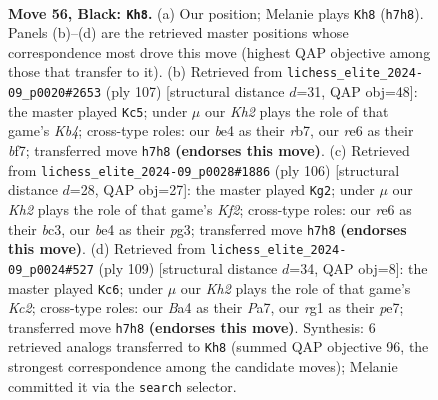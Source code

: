 \documentclass[11pt]{article}
\begin{document}
\clearpage

\begin{figure}[p]\centering
\begin{subfigure}{0.46\textwidth}\centering
\resizebox{\linewidth}{!}{%
\newchessgame
\chessboard[
  setfen={1r1r4/7k/pp2R3/8/bP2B3/P6K/8/6R1 b - - 15 56},
  showmover=false,
  pgfstyle=straightmove, color=movearrow, markmove={h7-h8}
]}
\caption{}
\end{subfigure}\hfill
\begin{subfigure}{0.46\textwidth}\centering
\resizebox{\linewidth}{!}{%
\newchessgame
\chessboard[
  setfen={8/1R3B2/3r2p1/1k6/8/b2p2P1/5P2/4K3 b - - 6 54},
  showmover=false,
  pgfstyle=straightmove, color=movearrow, markmove={b5-c5}
]}
\caption{}
\end{subfigure}
\\[4pt]
\begin{subfigure}{0.46\textwidth}\centering
\resizebox{\linewidth}{!}{%
\newchessgame
\chessboard[
  setfen={8/P7/R7/2r2p1k/4pP2/R1b3pP/5K2/3r4 w - - 0 54},
  showmover=false,
  pgfstyle=straightmove, color=movearrow, markmove={f2-g2}
]}
\caption{}
\end{subfigure}\hfill
\begin{subfigure}{0.46\textwidth}\centering
\resizebox{\linewidth}{!}{%
\newchessgame
\chessboard[
  setfen={8/p1k1PK2/8/1R4B1/1p2r3/8/4r3/8 b - - 3 55},
  showmover=false,
  pgfstyle=straightmove, color=movearrow, markmove={c7-c6}
]}
\caption{}
\end{subfigure}
\caption{\textbf{Move 56, Black: \texttt{Kh8}.} (a) Our position; Melanie plays \texttt{Kh8} (\texttt{h7h8}). Panels (b)--(d) are the retrieved master positions whose correspondence most drove this move (highest QAP objective among those that transfer to it). (b) Retrieved from \texttt{lichess\_elite\_2024-09\_p0020\#2653} (ply 107) [structural distance $d$=31, QAP obj=48]: the master played \texttt{Kc5}; under $\mu$ our \emph{Kh2} plays the role of that game's \emph{Kb4}; cross-type roles: our \emph{b}e4 as their \emph{r}b7, our \emph{r}e6 as their \emph{b}f7; transferred move \texttt{h7h8} \textbf{(endorses this move)}. (c) Retrieved from \texttt{lichess\_elite\_2024-09\_p0028\#1886} (ply 106) [structural distance $d$=28, QAP obj=27]: the master played \texttt{Kg2}; under $\mu$ our \emph{Kh2} plays the role of that game's \emph{Kf2}; cross-type roles: our \emph{r}e6 as their \emph{b}c3, our \emph{b}e4 as their \emph{p}g3; transferred move \texttt{h7h8} \textbf{(endorses this move)}. (d) Retrieved from \texttt{lichess\_elite\_2024-09\_p0024\#527} (ply 109) [structural distance $d$=34, QAP obj=8]: the master played \texttt{Kc6}; under $\mu$ our \emph{Kh2} plays the role of that game's \emph{Kc2}; cross-type roles: our \emph{B}a4 as their \emph{P}a7, our \emph{r}g1 as their \emph{p}e7; transferred move \texttt{h7h8} \textbf{(endorses this move)}. Synthesis: 6 retrieved analogs transferred to \texttt{Kh8} (summed QAP objective 96, the strongest correspondence among the candidate moves); Melanie committed it via the \texttt{search} selector.}
\label{fig:thought-m111}
\end{figure}
\end{document}
